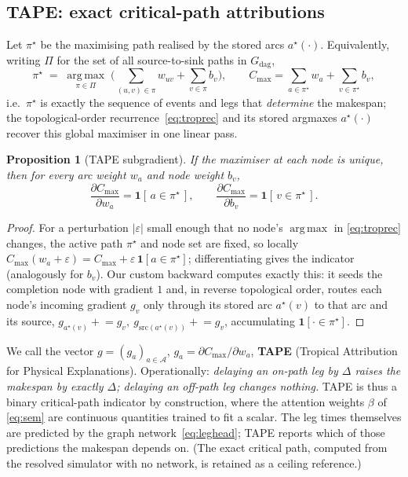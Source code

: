 \documentclass[11pt]{article}
\newtheorem{proposition}{Proposition}
\newcommand{\Cmax}{C_{\max}}
\newcommand{\argmax}{\operatorname*{arg\,max}}
\begin{document}
\subsection{TAPE: exact critical-path attributions}
\label{sec:tape}
Let $\pi^\star$ be the maximising path realised by the stored arcs $a^\star(\cdot)$.
Equivalently, writing $\Pi$ for the set of all source-to-sink paths in $G_{\mathrm{dag}}$,
\begin{equation}
\pi^\star \;=\; \argmax_{\pi\in\Pi}\;\Big(\textstyle\sum_{(u,v)\in\pi} w_{uv}+\sum_{v\in\pi} b_v\Big),
\qquad
\Cmax=\sum_{a\in\pi^\star} w_a+\sum_{v\in\pi^\star} b_v,
\label{eq:critpath}
\end{equation}
i.e.\ $\pi^\star$ is exactly the sequence of events and legs that \emph{determine} the
makespan; the topological-order recurrence~\eqref{eq:troprec} and its stored argmaxes
$a^\star(\cdot)$ recover this global maximiser in one linear pass.

\begin{proposition}[TAPE subgradient]
\label{prop:tape}
If the maximiser at each node is unique, then for every arc weight $w_a$ and node weight
$b_v$,
\begin{equation}
\boxed{\;\frac{\partial \Cmax}{\partial w_a}=\mathbf 1[\,a\in\pi^\star\,],
\qquad
\frac{\partial \Cmax}{\partial b_v}=\mathbf 1[\,v\in\pi^\star\,].\;}
\label{eq:tape}
\end{equation}
\end{proposition}
\begin{proof}
For a perturbation $|\varepsilon|$ small enough that no node's $\argmax$ in
\eqref{eq:troprec} changes, the active path $\pi^\star$ and node set are fixed, so locally
$\Cmax(w_a+\varepsilon)=\Cmax+\varepsilon\,\mathbf 1[a\in\pi^\star]$; differentiating gives
the indicator (analogously for $b_v$). Our custom backward computes exactly this: it seeds
the completion node with gradient $1$ and, in reverse topological order, routes each node's
incoming gradient $g_v$ only through its stored arc $a^\star(v)$ to that arc and its source,
$g_{a^\star(v)}\!\mathrel{+}=\!g_v,\ g_{\mathrm{src}(a^\star(v))}\!\mathrel{+}=\!g_v$,
accumulating $\mathbf 1[\cdot\in\pi^\star]$.
\end{proof}

We call the vector $g=(g_a)_{a\in\mathcal A}$, $g_a=\partial\Cmax/\partial w_a$,
\textbf{TAPE} (Tropical Attribution for Physical Explanations). Operationally:
\emph{delaying an on-path leg by $\Delta$ raises the makespan by exactly $\Delta$; delaying an
off-path leg changes nothing.} TAPE is thus a binary critical-path indicator by
construction, where the attention weights $\beta$ of \eqref{eq:sem} are continuous
quantities trained to fit a scalar. The leg times themselves are predicted by the graph
network~\eqref{eq:leghead}; TAPE reports which of those predictions the makespan depends
on. (The exact critical path, computed from the resolved simulator with no network, is
retained as a ceiling reference.)
\end{document}
